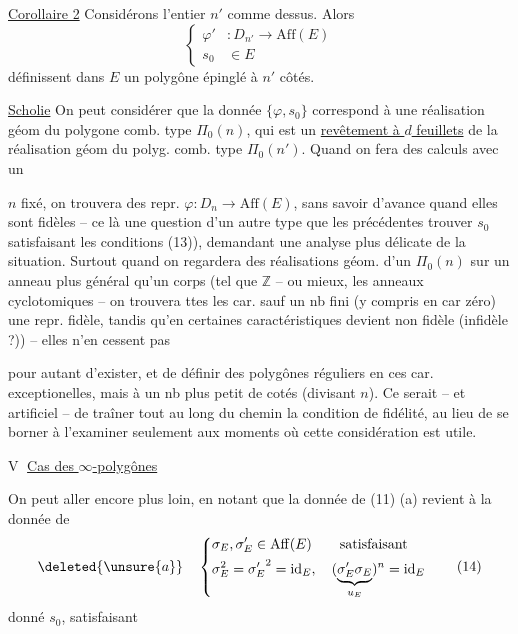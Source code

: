 \uline{Corollaire 2} Considérons  l'entier $n'$ comme  dessus. Alors 
\[
\left\{\begin{aligned}
\varphi' &:D_{n'}\longrightarrow\mathrm{Aff}(E)\\
s_0&\in E
\end{aligned}\right.
\]
définissent dans $E$ un polygône épinglé à $n'$ côtés.

\uline{Scholie} On peut considérer que la donnée $\{\varphi,s_0\}$ correspond à une réalisation géom du polygone comb. type $\Pi_0(n)$, qui est un \uline{revêtement à $d$ feuillets} de la réalisation géom  du polyg. comb. type $\Pi_0(n')$. Quand on fera des calculs avec un

$n$ fixé, on trouvera  des  repr. $\varphi:D_n\to\mathrm{Aff}(E)$, sans savoir d'avance quand elles sont fidèles -- ce  là une question d'un  autre type que les précédentes   trouver $s_0$ satisfaisant les conditions (13)), demandant une analyse plus  délicate de la situation. Surtout quand on regardera des réalisations géom. d'un $\Pi_0(n)$ sur un anneau plus général qu'un corps (tel que $\mathbb Z$ -- ou  mieux, les anneaux  cyclotomiques -- on trouvera    ttes les car. sauf un nb fini (y compris en car zéro) une repr. fidèle, tandis qu'en certaines caractéristiques  devient non fidèle (infidèle ?)) -- elles n'en cessent pas

pour autant d'exister, et de définir des polygônes réguliers en ces car. exceptionelles, mais à un nb plus petit de cotés (divisant $n$). Ce serait  -- et  artificiel -- de traîner tout au long du chemin la condition de fidélité, au lieu de se borner à l'examiner seulement aux moments  où cette considération est utile.

\textcircled{V}  \uline{Cas des $\infty$-polygônes}

On peut aller encore plus loin, en notant que la donnée de (11) (a) revient à la donnée de
\[
\deleted{\unsure{a}}\quad
\left\{\begin{aligned}
&\sigma_E,\sigma'_E\in\mathrm{Aff}(E)\qquad\text{satisfaisant}\\
&\sigma_E^2={\sigma'_E}^2=\mathrm{id}_E,\quad
(\underbrace{\sigma'_E\sigma_E}_{u_E})^n=\mathrm{id}_E
\end{aligned}\right.\tag*{(14)}
\]
     donné $s_0$,  satisfaisant

